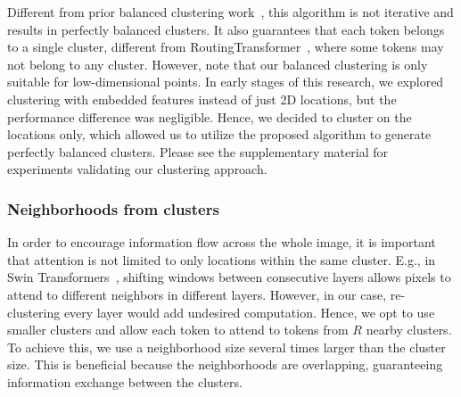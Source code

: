 \documentclass[10pt,twocolumn,letterpaper]{article}
\begin{document}
Different from prior balanced clustering work~\cite{banerjee2006scalable}, this algorithm is not iterative and  results in perfectly balanced clusters. It also guarantees that each token belongs to a single cluster, different from RoutingTransformer~\cite{roy2021efficient}, where some tokens may not belong to any  cluster. However, note that our balanced clustering is only suitable for low-dimensional points. In early stages of this research, we explored clustering with embedded features instead of just 2D locations, but the performance difference was negligible. Hence, we decided to cluster on the locations only, which allowed us to utilize the proposed algorithm to generate perfectly balanced clusters. Please see the supplementary material for experiments validating our clustering approach.


\subsubsection{Neighborhoods from clusters} In order to encourage information flow across the whole image, it is important that attention is not limited to only locations within the same cluster. E.g., in Swin Transformers~\cite{swin}, shifting windows between consecutive layers allows pixels to attend to different neighbors in different layers. However, in our case, re-clustering every layer would add undesired computation. Hence, we opt to use 
smaller clusters and allow each token to attend to tokens from $R$ nearby clusters. To achieve this, we use a neighborhood size several times larger than the cluster size. This is beneficial because the neighborhoods are overlapping, guaranteeing  information exchange between the clusters. 
\end{document}
